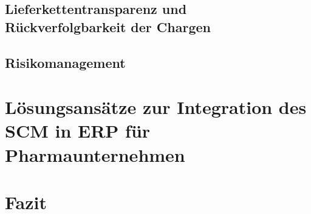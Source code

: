 \documentclass{article}
\begin{document}
\subsection{Lieferkettentransparenz und Rückverfolgbarkeit der Chargen}
\subsection{Risikomanagement}

\section{Lösungsansätze zur Integration des SCM in ERP für Pharmaunternehmen}
\section{Fazit}
\subsection{}

\end{document}
